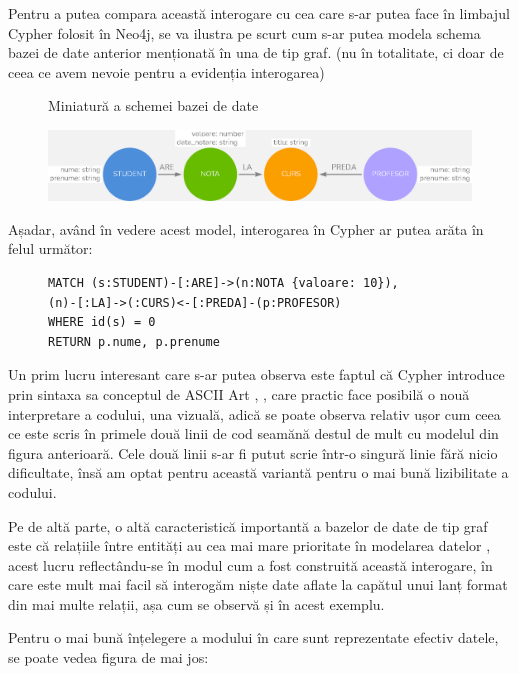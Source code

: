 \documentclass[12pt,a4paper]{report}
\begin{document}
Pentru a putea compara această interogare cu cea care s-ar putea face în limbajul Cypher folosit în Neo4j, se va ilustra pe scurt cum s-ar putea modela schema bazei de date anterior menționată în una de tip graf. (nu în totalitate, ci doar de ceea ce avem nevoie pentru a evidenția interogarea)


\begin{figure}[h]
\centering
\caption{Miniatură a schemei bazei de date}
\includegraphics[scale=0.4]{exemplu_3_neo4j}
\caption*{}
\end{figure}


Așadar, având în vedere acest model, interogarea în Cypher ar putea arăta în felul următor:

\begin{figure}[h]
\centering
\begin{BVerbatim}
MATCH (s:STUDENT)-[:ARE]->(n:NOTA {valoare: 10}),
(n)-[:LA]->(:CURS)<-[:PREDA]-(p:PROFESOR)
WHERE id(s) = 0
RETURN p.nume, p.prenume
\end{BVerbatim}
\end{figure}



Un prim lucru interesant care s-ar putea observa este faptul că Cypher introduce prin sintaxa sa conceptul de ASCII Art \cite{8}, \cite{9}, care practic face posibilă o nouă interpretare a codului, una vizuală, adică se poate observa relativ ușor cum ceea ce este scris în primele două linii de cod seamănă destul de mult cu modelul din figura anterioară.
Cele două linii s-ar fi putut scrie într-o singură linie fără nicio dificultate, însă am optat pentru această variantă pentru o mai bună lizibilitate a codului.

Pe de altă parte, o altă caracteristică importantă a bazelor de date de tip graf este că relațiile între entități au cea mai mare prioritate în modelarea datelor \cite{10}, acest lucru reflectându-se în modul cum a fost construită această interogare, în care este mult mai facil să interogăm niște date aflate la capătul unui lanț format din mai multe relații, așa cum se observă și în acest exemplu.

Pentru o mai bună înțelegere a modului în care sunt reprezentate efectiv datele, se poate vedea figura de mai jos:
\end{document}
